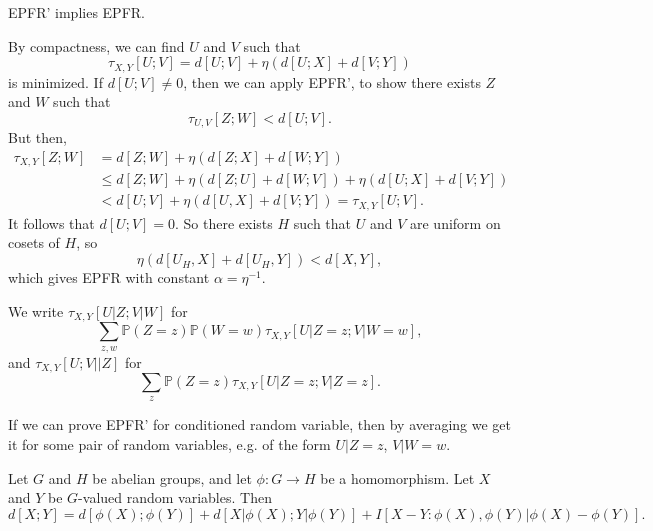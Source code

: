 \documentclass[12pt]{article}
\begin{document}

\begin{proposition}
	EPFR' implies EPFR.
\end{proposition}

\begin{proofbox}
	By compactness, we can find $U$ and $V$ such that
	\[
		\tau_{X, Y}[U; V] = d[U; V] + \eta (d[U; X] + d[V; Y])
	\]
	is minimized. If $d[U; V] \neq 0$, then we can apply EPFR', to show there exists $Z$ and $W$ such that
	\[
		\tau_{U, V}[Z; W] < d[U; V].
	\]
	But then,
	\begin{align*}
		\tau_{X, Y}[Z; W] &= d[Z; W] + \eta (d[Z; X] + d[W; Y]) \\
				  &\leq d[Z; W] + \eta (d[Z; U] + d[W; V]) + \eta(d[U; X] + d[V; Y]) \\
				  &< d[U; V] + \eta(d[U, X] + d[V; Y]) = \tau_{X, Y}[U; V].
	\end{align*}
	It follows that $d[U; V] = 0$. So there exists $H$ such that $U$ and $V$ are uniform on cosets of $H$, so
	\[
		\eta(d[U_H, X] + d[U_H, Y]) < d[X, Y],
	\]
	which gives EPFR with constant $\alpha = \eta^{-1}$.
\end{proofbox}

\begin{definition}
	We write $\tau_{X, Y}[U|Z; V|W]$ for
	\[
		\sum_{z, w} \mathbb{P}(Z = z) \mathbb{P}(W = w) \tau_{X,Y}[U|Z = z; V|W = w],
	\]
	and $\tau_{X, Y}[U; V||Z]$ for
	\[
		\sum_z \mathbb{P}(Z = z) \tau_{X, Y}[U|Z = z; V|Z = z].
	\]
\end{definition}

\begin{remark}
	If we can prove EPFR' for conditioned random variable, then by averaging we get it for some pair of random variables, e.g. of the form $U|Z = z$, $V|W = w$.
\end{remark}

\begin{lemma}
	Let $G$ and $H$ be abelian groups, and let $\phi : G \to H$ be a homomorphism. Let $X$ and $Y$ be $G$-valued random variables. Then
	\[
		d[X; Y] = d[\phi(X); \phi(Y)] + d[X|\phi(X); Y|\phi(Y)] + I[X-Y:\phi(X), \phi(Y)|\phi(X)-\phi(Y)].
	\]
\end{lemma}
\end{document}
